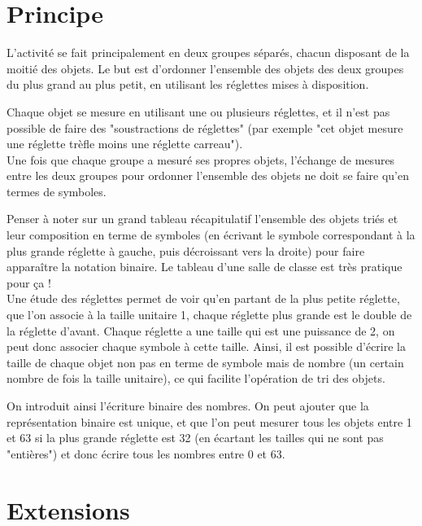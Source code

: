 \documentclass[a4paper,12pt]{scrartcl}
\begin{document}
\section{Principe}

L'activité se fait principalement en deux groupes séparés, chacun disposant de la moitié des objets.
Le but est d'ordonner l'ensemble des objets des deux groupes du plus grand au plus petit, en utilisant les réglettes mises à disposition.

Chaque objet se mesure en utilisant une ou plusieurs réglettes, et il n'est pas possible de faire des "soustractions de réglettes" (par exemple "cet objet mesure une réglette trèfle moins une réglette carreau").\\


Une fois que chaque groupe a mesuré ses propres objets, l'échange de mesures entre les deux groupes pour ordonner l'ensemble des objets ne doit se faire qu'en termes de symboles.

Penser à noter sur un grand tableau récapitulatif l'ensemble des objets triés et leur composition en terme de symboles (en écrivant le symbole correspondant à la plus grande réglette à gauche, puis décroissant vers la droite) pour faire apparaître la notation binaire. Le tableau d'une salle de classe est très pratique pour ça !\\


Une étude des réglettes permet de voir qu'en partant de la plus petite réglette, que l'on associe à la taille unitaire 1, chaque réglette plus grande est le double de la réglette d'avant. 
%
Chaque réglette a une taille qui est une puissance de 2, on peut donc associer chaque symbole à cette taille. Ainsi, il est possible d'écrire la taille de chaque objet non pas en terme de symbole mais de nombre (un certain nombre de fois la taille unitaire), ce qui facilite l'opération de tri des objets.

On introduit ainsi l'écriture binaire des nombres.
On peut ajouter que la représentation binaire est unique, et que l'on peut mesurer tous les objets entre 1 et 63 si la plus grande réglette est 32 (en écartant les tailles qui ne sont pas "entières") et donc écrire tous les nombres entre 0 et 63.


\section{Extensions}
\end{document}
